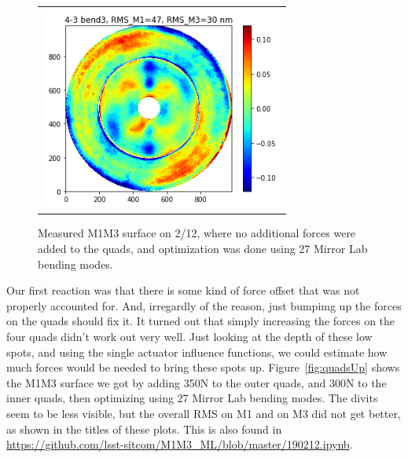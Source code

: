 \documentclass [twoside,openbib,12pt]{article}
\begin{document}
 \begin{figure}[bthp]
   \begin{center}
     \begin{tabular}{c}
\includegraphics[width=80mm]{figures/divits_190212.png}
  \end{tabular}
   \end{center}
   \caption
   { \label{fig:divits}
     Measured M1M3 surface on 2/12, where no additional forces were
     added to the quads, and optimization was done using 27 Mirror
     Lab bending modes.
 }
\end{figure}


Our first reaction was that there is some kind of force offset that
was not properly accounted for. And, irregardly of the reason, just
bumpimg up the forces on the quads should fix it.
It turned out that simply increasing the forces on the four quads
didn't work out very well.
Just looking at the depth of these low spots, and using the single
actuator influence functions, we could estimate how much forces would be
needed to bring these spots up.
Figure~\ref{fig:quadsUp} shows the M1M3 surface we got by adding 350N to the outer
     quads, and 300N to the inner quads, then optimizing using 27 Mirror Lab
     bending modes.
     The divits seem to be less visible, but the overall RMS on M1 and
     on M3 did not get better, as shown in the titles of these plots.
   This is also found in \url{https://github.com/lsst-sitcom/M1M3_ML/blob/master/190212.ipynb}.
\end{document}
